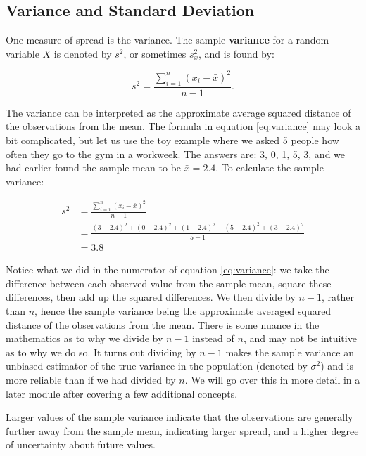 \documentclass[
]{book}
\begin{document}
\subsection{Variance and Standard Deviation}\label{variance-and-standard-deviation}

One measure of spread is the variance. The sample \textbf{variance} for a random variable \(X\) is denoted by \(s^2\), or sometimes \(s_x^2\), and is found by:

\begin{equation} 
s^2 = \frac{\sum_{i=1}^n (x_i-\bar{x})^2}{n-1}.
\label{eq:variance}
\end{equation}

The variance can be interpreted as the approximate average squared distance of the observations from the mean. The formula in equation \eqref{eq:variance} may look a bit complicated, but let us use the toy example where we asked 5 people how often they go to the gym in a workweek. The answers are: 3, 0, 1, 5, 3, and we had earlier found the sample mean to be \(\bar{x} = 2.4\). To calculate the sample variance:

\[
\begin{split}
s^2 &= \frac{\sum_{i=1}^n (x_i-\bar{x})^2}{n-1}\\
 &= \frac{(3-2.4)^2 + (0-2.4)^2 + (1-2.4)^2 + (5-2.4)^2 + (3-2.4)^2}{5-1} \\
&= 3.8 
\end{split}
\]

Notice what we did in the numerator of equation \eqref{eq:variance}: we take the difference between each observed value from the sample mean, square these differences, then add up the squared differences. We then divide by \(n-1\), rather than \(n\), hence the sample variance being the approximate averaged squared distance of the observations from the mean. There is some nuance in the mathematics as to why we divide by \(n-1\) instead of \(n\), and may not be intuitive as to why we do so. It turns out dividing by \(n-1\) makes the sample variance an unbiased estimator of the true variance in the population (denoted by \(\sigma^2\)) and is more reliable than if we had divided by \(n\). We will go over this in more detail in a later module after covering a few additional concepts.

Larger values of the sample variance indicate that the observations are generally further away from the sample mean, indicating larger spread, and a higher degree of uncertainty about future values.
\end{document}
